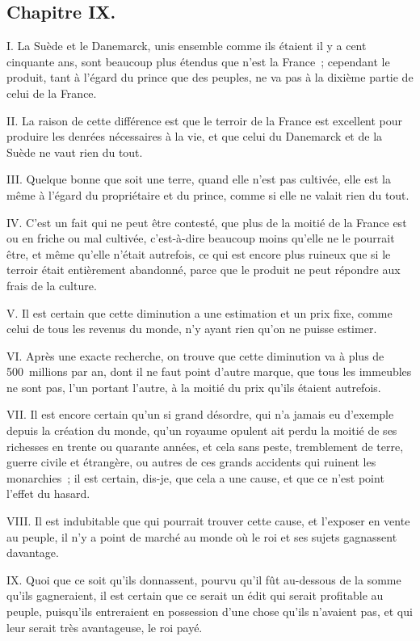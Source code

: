 \documentclass[french,twoside]{book} %
\begin{document}
\subsection[{Chapitre IX.}]{Chapitre IX.}
\noindent I. La Suède et le Danemarck, unis ensemble comme ils étaient il y a cent cinquante ans, sont beaucoup plus étendus que n’est la France ; cependant le produit, tant à l’égard du prince que des peuples, ne va pas à la dixième partie de celui de la France.\par
II. La raison de cette différence est que le terroir de la France est excellent pour produire les denrées nécessaires à la vie, et que celui du Danemarck et de la Suède ne vaut rien du tout.\par
III. Quelque bonne que soit une terre, quand elle n’est pas cultivée, elle est la même à l’égard du propriétaire et du prince, comme si elle ne valait rien du tout.\par
IV. C’est un fait qui ne peut être contesté, que plus de la moitié de la France est ou en friche ou mal cultivée, c’est-à-dire beaucoup moins qu’elle ne le pourrait être, et même qu’elle n’était autrefois, ce qui est encore plus ruineux que si le terroir était entièrement abandonné, parce que le produit ne peut répondre aux frais de la culture.\par
V. Il est certain que cette diminution a une estimation et un prix fixe, comme celui de tous les revenus du monde, n’y ayant rien qu’on ne puisse estimer.\par
VI. Après une exacte recherche, on trouve que cette diminution va à plus de 500 millions par an, dont il ne faut point d’autre marque, que tous les immeubles ne sont pas, l’un portant l’autre, à la moitié du prix qu’ils étaient autrefois.\par
VII. Il est encore certain qu’un si grand désordre, qui n’a jamais eu d’exemple depuis la création du monde, qu’un royaume opulent ait perdu la moitié de ses richesses en trente ou quarante années, et cela sans peste, tremblement de terre, guerre civile et étrangère, ou autres de ces grands accidents qui ruinent les monarchies ; il est certain, dis-je, que cela a une cause, et que ce n’est point l’effet du hasard.\par
VIII. Il est indubitable que qui pourrait trouver cette cause, et l’exposer en vente au peuple, il n’y a point de marché au monde où le roi et ses sujets gagnassent davantage.\par
IX. Quoi que ce soit qu’ils donnassent, pourvu qu’il fût au-dessous de la somme qu’ils gagneraient, il est certain que ce serait un édit qui serait profitable au peuple, puisqu’ils entreraient en possession d’une chose qu’ils n’avaient pas, et qui leur serait très avantageuse, le roi payé.\par
\end{document}
